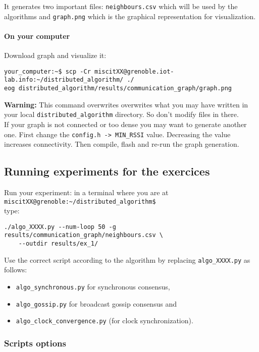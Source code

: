 \documentclass{article}
\begin{document}
It generates two important files:
\texttt{neighbours.csv} which will be used by the algorithms and
\texttt{graph.png} which is the graphical representation for visualization.

\paragraph{On your computer} Download graph and visualize it:
\begin{verbatim}your_computer:~$ scp -Cr miscitXX@grenoble.iot-lab.info:~/distributed_algorithm/ ./
eog distributed_algorithm/results/communication_graph/graph.png\end{verbatim}

\textbf{Warning:} This command overwrites overwrites what you may have written
in your local \verb=distributed_algorithm= directory. So don't modify files in there.\\

If your graph is not connected or too dense you may want to generate another one.
First change the \verb=config.h -> MIN_RSSI= value. Decreasing the value
increases connectivity. Then compile, flash and re-run the graph generation.

\subsection{Running experiments for the exercices}

Run your experiment: in a terminal where you are at \\
\verb=miscitXX@grenoble:~/distributed_algorithm$= \\
type:
\begin{verbatim}
./algo_XXXX.py --num-loop 50 -g results/communication_graph/neighbours.csv \
    --outdir results/ex_1/
\end{verbatim}

Use the correct script according to the algorithm by replacing
\verb=algo_XXXX.py= as follows:
\begin{itemize}
    \item \verb=algo_synchronous.py= for synchronous consensus,
    \item \verb=algo_gossip.py= for broadcast gossip consensus and
    \item \verb=algo_clock_convergence.py= (for clock synchronization).
\end{itemize}

\subsubsection{Scripts options}
\end{document}
